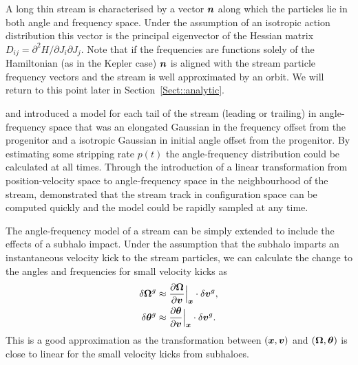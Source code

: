 \documentclass[useAMS,usenatbib,fleqn,a4paper]{mn2e}
\newcommand{\bs}[1]{\bmath{#1}}
\begin{document}
A long thin stream is characterised by a vector $\bs{n}$ along which the particles lie in both angle and frequency space. Under the assumption of an isotropic action distribution this vector is the principal eigenvector of the Hessian matrix $D_{ij}=\partial^2 H/\partial J_i\partial J_j$. Note that if the frequencies are functions solely of the Hamiltonian (as in the Kepler case) $\bs{n}$ is aligned with the stream particle frequency vectors and the stream is well approximated by an orbit. We will return to this point later in Section~\ref{Sect::analytic}.

\cite{Bovy2014} and \cite{Sanders2014} introduced a model for each tail of the stream (leading or trailing) in angle-frequency space that was an elongated Gaussian in the frequency offset from the progenitor and a isotropic Gaussian in initial angle offset from the progenitor. By estimating some stripping rate $p(t)$ the angle-frequency distribution could be calculated at all times. Through the introduction of a linear transformation from position-velocity space to angle-frequency space in the neighbourhood of the stream, \cite{Bovy2014} demonstrated that the stream track in configuration space can be computed quickly and the model could be rapidly sampled at any time.

The angle-frequency model of a stream can be simply extended to include the effects of a subhalo impact. Under the assumption that the subhalo imparts an instantaneous velocity kick to the stream particles, we can calculate the change to the angles and frequencies for small velocity kicks as
\begin{equation}\label{eq:kickfreqangle}
\begin{split}
\delta \boldsymbol{\Omega}^g &\approx \frac{\upartial \boldsymbol{\Omega}}{\upartial \bs{v}}\Big|_{\bs{x}}\cdot \delta\bs{v}^g,\\
\delta \bs{\theta}^g &\approx \frac{\upartial \bs{\theta}}{\upartial \bs{v}}\Big|_{\bs{x}}\cdot \delta\bs{v}^g.
\end{split}
\end{equation}
This is a good approximation as the transformation between $(\bs{x},\bs{v})$ and $(\boldsymbol{\Omega},\bs{\theta})$ is close to linear for the small velocity kicks from subhaloes.
\end{document}
